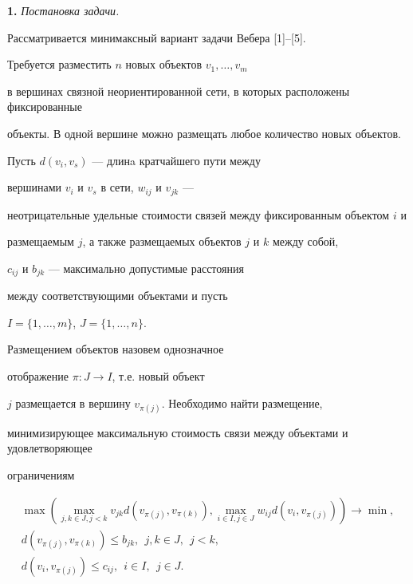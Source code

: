 \date{}




\pagestyle{plain} %







\maketitle


\label{begin}








{\bf 1.} {\it Постановка задачи.}


Рассматривается минимаксный вариант задачи Вебера [1]--[5].


Требуется разместить $n$ новых объектов $v_{1},\dotsc,v_{m}$


в вершинах связной неориентированной сети, в которых расположены фиксированные


объекты. В одной вершине можно размещать любое количество новых объектов.


Пусть $d(v_{i},v_{s})$ --- длинa кратчайшего пути между


вершинами $v_{i}$ и $v_{s}$ в сети, $w_{ij}$ и $v_{jk}$ ---


неотрицательные удельные стоимости связей между фиксированным объектом $i$ и


размещаемым $j$, а также размещаемых объектов $j$ и $k$ между собой,


$c_{ij}$ и $b_{jk}$ --- максимально допустимые расстояния 


между соответствующими объектами и пусть 


$I=\{1,\dotsc,m\}$, $J=\{1,\dotsc,n\}$.


Размещением объектов назовем однозначное


отображение $\pi: J \rightarrow I$, т.е. новый объект


$j$ размещается в вершину $v_{\pi(j)}$. Необходимо найти размещение,


минимизирующее максимальную стоимость связи между объектами и удовлетворяющее


ограничениям


\begin{gather}


\max (\max_{j,k \in J, j < k} v_{jk}d(v_{\pi(j)},v_{\pi(k)}),


\max_{i \in I, j \in J} w_{ij}d(v_{i},v_{\pi(j)}))


\rightarrow \min, \\


d(v_{\pi(j)},v_{\pi(k)}) \leq b_{jk}, \ \ j,k \in J, \ \ j < k, \\


d(v_{i},v_{\pi(j)}) \leq c_{ij}, \ \ i \in I, \ \ j \in J.


\end{gather}





